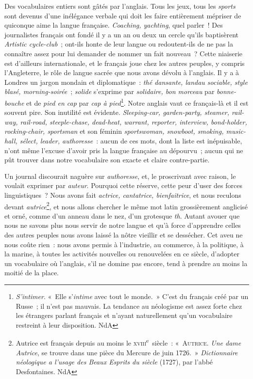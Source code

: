 \documentclass[french,twoside]{book} %
\begin{document}
Des vocabulaires entiers sont gâtés par l’anglais. Tous les jeux, tous les {\itshape sports} sont devenus d’une inélégance verbale qui doit les faire entièrement mépriser de quiconque aime la langue française. {\itshape Coaching, yachting}, quel parler ! Des journalistes français ont fondé il y a un an ou deux un cercle qu’ils baptisèrent {\itshape Artistic cycle-club} ; ont-ils honte de leur langue ou redoutent-ils de ne pas la connaître assez pour lui demander de nommer un fait nouveau ? Cette niaiserie est d’ailleurs internationale, et le français joue chez les autres peuples, y compris l’Angleterre, le rôle de langue sacrée que nous avons dévolu à l’anglais. Il y a à Londres un jargon mondain et diplomatique : {\itshape thé dansante, landau sociable, style blasé, morning-soirée} ; {\itshape solide} s’exprime par {\itshape solidaire, bon morceau} par {\itshape bonne-bouche} et de {\itshape pied en cap} par {\itshape cap à pied}\footnote{{\itshape S’intimer}. « Elle s’{\itshape intime} avec tout le monde. » C’est du français créé par un Russe ; il n’est pas mauvais. La tendance au néologisme est assez forte chez les étrangers parlant français et n’ayant naturellement qu’un vocabulaire restreint à leur disposition. NdA}. Notre anglais vaut ce français-là et il est souvent pire. Son inutilité est évidente. {\itshape Sleeping-car, garden-party, steamer, rail-way, rail-road, steeple-chase, dead-heat, warrant, reporter, interview, bond-holder, rocking-chair, sportsman} et son féminin {\itshape sportswoman, snowboot, smoking, music-hall, sélect, leader, authoresse} : aucun de ces mots, dont la liste est inépuisable, n’ont même l’excuse d’avoir pris la langue française au dépourvu ; aucun qui ne pût trouver dans notre vocabulaire son exacte et claire contre-partie.\par
Un journal discourait naguère sur {\itshape authoresse}, et, le proscrivant avec raison, le voulait exprimer par {\itshape auteur}. Pourquoi cette réserve, cette peur d’user des forces linguistiques ? Nous avons fait {\itshape actrice, cantatrice, bienfaitrice}, et nous reculons devant {\itshape autrice}\footnote{Autrice est français depuis au moins le \textsc{xviii}\textsuperscript{e} siècle : « {\scshape Autrice}. {\itshape Une dame Autrice}, se trouve dans une pièce du Mercure de juin 1726. » {\itshape Dictionnaire néologique a l’usage des Beaux Esprits du siècle} (1727), par l’abbé Desfontaines. NdA}, et nous allons chercher le même mot latin grossièrement anglicisé et orné, comme d’un anneau dans le nez, d’un grotesque {\itshape th}. Autant avouer que nous ne savons plus nous servir de notre langue et qu’à force d’apprendre celles des autres peuples nous avons laissé la nôtre vieillir et se dessécher. Cet aveu ne nous coûte rien : nous avons permis à l’industrie, au commerce, à la politique, à la marine, à toutes les activités nouvelles ou renouvelées en ce siècle, d’adopter un vocabulaire où l’anglais, s’il ne domine pas encore, tend à prendre au moins la moitié de la place.\par
\end{document}
